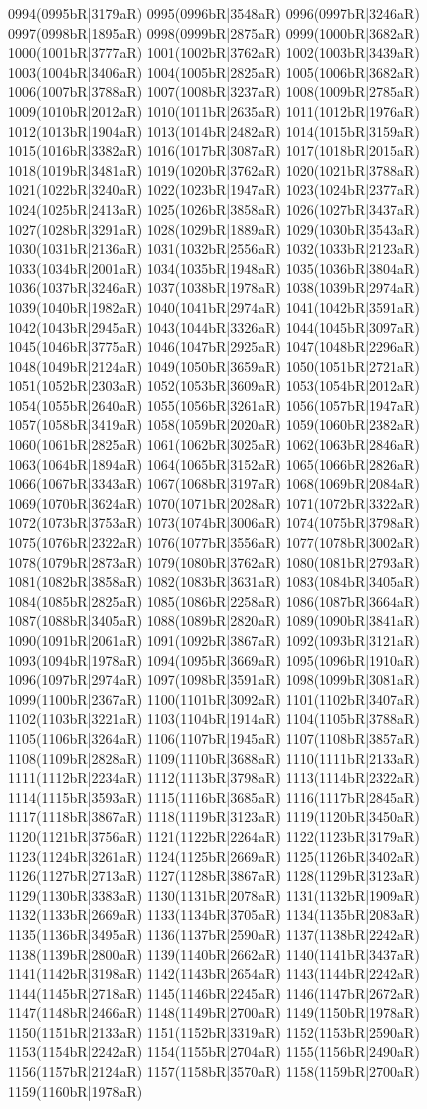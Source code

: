 0994(0995bR|3179aR) 0995(0996bR|3548aR) 0996(0997bR|3246aR) 0997(0998bR|1895aR) 0998(0999bR|2875aR) 0999(1000bR|3682aR) 1000(1001bR|3777aR) 1001(1002bR|3762aR) 1002(1003bR|3439aR) 1003(1004bR|3406aR) 1004(1005bR|2825aR) 1005(1006bR|3682aR) 1006(1007bR|3788aR) 1007(1008bR|3237aR) 1008(1009bR|2785aR) 1009(1010bR|2012aR) 1010(1011bR|2635aR) 1011(1012bR|1976aR) 1012(1013bR|1904aR) 1013(1014bR|2482aR) 1014(1015bR|3159aR) 1015(1016bR|3382aR) 1016(1017bR|3087aR) 1017(1018bR|2015aR) 1018(1019bR|3481aR) 1019(1020bR|3762aR) 1020(1021bR|3788aR) 1021(1022bR|3240aR) 1022(1023bR|1947aR) 1023(1024bR|2377aR) 1024(1025bR|2413aR) 1025(1026bR|3858aR) 1026(1027bR|3437aR) 1027(1028bR|3291aR) 1028(1029bR|1889aR) 1029(1030bR|3543aR) 1030(1031bR|2136aR) 1031(1032bR|2556aR) 1032(1033bR|2123aR) 1033(1034bR|2001aR) 1034(1035bR|1948aR) 1035(1036bR|3804aR) 1036(1037bR|3246aR) 1037(1038bR|1978aR) 1038(1039bR|2974aR) 1039(1040bR|1982aR) 1040(1041bR|2974aR) 1041(1042bR|3591aR) 1042(1043bR|2945aR) 1043(1044bR|3326aR) 1044(1045bR|3097aR) 1045(1046bR|3775aR) 1046(1047bR|2925aR) 1047(1048bR|2296aR) 1048(1049bR|2124aR) 1049(1050bR|3659aR) 1050(1051bR|2721aR) 1051(1052bR|2303aR) 1052(1053bR|3609aR) 1053(1054bR|2012aR) 1054(1055bR|2640aR) 1055(1056bR|3261aR) 1056(1057bR|1947aR) 1057(1058bR|3419aR) 1058(1059bR|2020aR) 1059(1060bR|2382aR) 1060(1061bR|2825aR) 1061(1062bR|3025aR) 1062(1063bR|2846aR) 1063(1064bR|1894aR) 1064(1065bR|3152aR) 1065(1066bR|2826aR) 1066(1067bR|3343aR) 1067(1068bR|3197aR) 1068(1069bR|2084aR) 1069(1070bR|3624aR) 1070(1071bR|2028aR) 1071(1072bR|3322aR) 1072(1073bR|3753aR) 1073(1074bR|3006aR) 1074(1075bR|3798aR) 1075(1076bR|2322aR) 1076(1077bR|3556aR) 1077(1078bR|3002aR) 1078(1079bR|2873aR) 1079(1080bR|3762aR) 1080(1081bR|2793aR) 1081(1082bR|3858aR) 1082(1083bR|3631aR) 1083(1084bR|3405aR) 1084(1085bR|2825aR) 1085(1086bR|2258aR) 1086(1087bR|3664aR) 1087(1088bR|3405aR) 1088(1089bR|2820aR) 1089(1090bR|3841aR) 1090(1091bR|2061aR) 1091(1092bR|3867aR) 1092(1093bR|3121aR) 1093(1094bR|1978aR) 1094(1095bR|3669aR) 1095(1096bR|1910aR) 1096(1097bR|2974aR) 1097(1098bR|3591aR) 1098(1099bR|3081aR) 1099(1100bR|2367aR) 1100(1101bR|3092aR) 1101(1102bR|3407aR) 1102(1103bR|3221aR) 1103(1104bR|1914aR) 1104(1105bR|3788aR) 1105(1106bR|3264aR) 1106(1107bR|1945aR) 1107(1108bR|3857aR) 1108(1109bR|2828aR) 1109(1110bR|3688aR) 1110(1111bR|2133aR) 1111(1112bR|2234aR) 1112(1113bR|3798aR) 1113(1114bR|2322aR) 1114(1115bR|3593aR) 1115(1116bR|3685aR) 1116(1117bR|2845aR) 1117(1118bR|3867aR) 1118(1119bR|3123aR) 1119(1120bR|3450aR) 1120(1121bR|3756aR) 1121(1122bR|2264aR) 1122(1123bR|3179aR) 1123(1124bR|3261aR) 1124(1125bR|2669aR) 1125(1126bR|3402aR) 1126(1127bR|2713aR) 1127(1128bR|3867aR) 1128(1129bR|3123aR) 1129(1130bR|3383aR) 1130(1131bR|2078aR) 1131(1132bR|1909aR) 1132(1133bR|2669aR) 1133(1134bR|3705aR) 1134(1135bR|2083aR) 1135(1136bR|3495aR) 1136(1137bR|2590aR) 1137(1138bR|2242aR) 1138(1139bR|2800aR) 1139(1140bR|2662aR) 1140(1141bR|3437aR) 1141(1142bR|3198aR) 1142(1143bR|2654aR) 1143(1144bR|2242aR) 1144(1145bR|2718aR) 1145(1146bR|2245aR) 1146(1147bR|2672aR) 1147(1148bR|2466aR) 1148(1149bR|2700aR) 1149(1150bR|1978aR) 1150(1151bR|2133aR) 1151(1152bR|3319aR) 1152(1153bR|2590aR) 1153(1154bR|2242aR) 1154(1155bR|2704aR) 1155(1156bR|2490aR) 1156(1157bR|2124aR) 1157(1158bR|3570aR) 1158(1159bR|2700aR) 1159(1160bR|1978aR) 